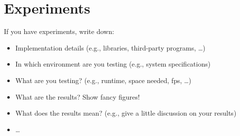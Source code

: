 \chapter{Experiments}
If you have experiments, write down:
\begin{itemize}
	\item Implementation details (e.g., libraries, third-party programs, \dots)
	\item In which environment are you testing (e.g., system specifications)
	\item What are you testing? (e.g., runtime, space needed, fps, \dots)
	\item What are the results? Show fancy figures!
	\item What does the results mean? (e.g., give a little discussion on your results)
	\item \dots
\end{itemize}